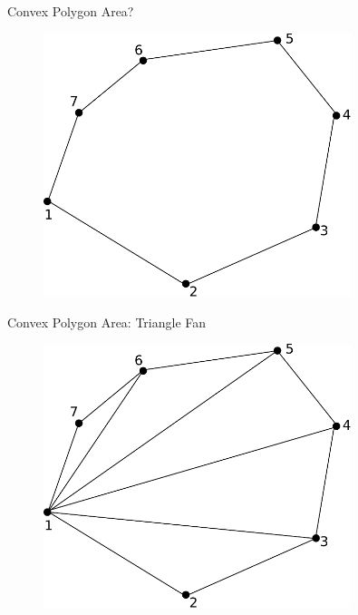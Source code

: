 \documentclass{beamer}
\begin{document}
\begin{frame}{Convex Polygon Area?}

\begin{figure}[t]
\centering
\includegraphics[width=0.8\textwidth]{PointInsidePolygonEmpty.pdf}
\end{figure}

\end{frame}


\begin{frame}{Convex Polygon Area: Triangle Fan}

\begin{figure}[t]
\centering
\includegraphics[width=0.8\textwidth]{TriangleFan.pdf}
\end{figure}


\end{frame}
\end{document}

